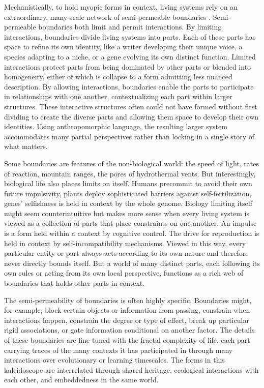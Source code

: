 \documentclass[12pt]{article}
\begin{document}
Mechanistically, to hold myopic forms in context, living systems rely on an extraordinary, many-scale network of semi-permeable boundaries \citep{maturana2012autopoiesis, simon1962architecture, kirchhoff2018markov, moreno2015biological}. Semi-permeable boundaries both limit and permit interactions. By limiting interactions, boundaries divide living systems into parts. Each of these parts has space to refine its own identity, like a writer developing their unique voice, a species adapting to a niche, or a gene evolving its own distinct function. Limited interactions protect parts from being dominated by other parts or blended into homogeneity, either of which is collapse to a form admitting less nuanced description. By allowing interactions, boundaries enable the parts to participate in relationships with one another, contextualizing each part within larger structures. These interactive structures often could not have formed without first dividing to create the diverse parts and allowing them space to develop their own identities. Using anthropomorphic language, the resulting larger system accommodates many partial perspectives rather than locking in a single story of what matters. 

Some boundaries are features of the non-biological world: the speed of light, rates of reaction, mountain ranges, the pores of hydrothermal vents. But interestingly, biological life also places limits on itself. Humans precommit to avoid their own future impulsivity, plants deploy sophisticated barriers against self-fertilization, genes' selfishness is held in context by the whole genome. Biology limiting itself might seem counterintuitive but makes more sense when every living system is viewed as a collection of parts that place constraints on one another. An impulse is a form held within a context by cognitive control. The drive for reproduction is held in context by self-incompatibility mechanisms. Viewed in this way, every particular entity or part always acts according to its own nature and therefore never directly bounds itself. But a world of many distinct parts, each following its own rules or acting from its own local perspective, functions as a rich web of boundaries that holds other parts in context.

The semi-permeability of boundaries is often highly specific. Boundaries might, for example, block certain objects or information from passing, constrain when interactions happen, constrain the degree or type of effect, break up particular rigid associations, or gate information conditional on another factor. The details of these boundaries are fine-tuned with the fractal complexity of life, each part carrying traces of the many contexts it has participated in through many interactions over evolutionary or learning timescales. The forms in this kaleidoscope are interrelated through shared heritage, ecological interactions with each other, and embeddedness in the same world.
\end{document}
